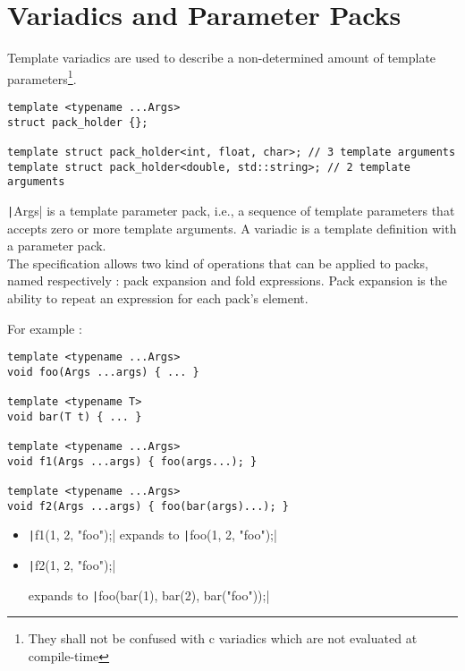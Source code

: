 \section*{Variadics and Parameter Packs}

Template variadics are used to describe a non-determined amount of template parameters\footnote{They shall not be confused with c variadics which are not evaluated at compile-time}.
\begin{verbatim}
template <typename ...Args>
struct pack_holder {};

template struct pack_holder<int, float, char>; // 3 template arguments
template struct pack_holder<double, std::string>; // 2 template arguments
\end{verbatim}

\texttt|Args| is a template parameter pack, i.e., a sequence of template parameters that accepts  zero or more template arguments. A variadic is a template definition with a parameter pack. \\

The specification allows two kind of operations that can be applied to packs, named respectively : pack expansion and fold expressions.
Pack expansion is the ability to repeat an expression for each pack's element.

\newpage

For example :
\begin{paracol}{2}
\begin{verbatim}
template <typename ...Args>
void foo(Args ...args) { ... }

template <typename T>
void bar(T t) { ... }

template <typename ...Args>
void f1(Args ...args) { foo(args...); }

template <typename ...Args>
void f2(Args ...args) { foo(bar(args)...); }
\end{verbatim}

\switchcolumn

\vspace{20pt}

\begin{itemize}
    \item \texttt|f1(1, 2, "foo");| 
        expands to \texttt|foo(1, 2, "foo");|
    \item \texttt|f2(1, 2, "foo");| 
        
        expands to \texttt|foo(bar(1), bar(2), bar("foo"));|
\end{itemize}

\end{paracol}


